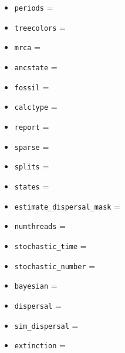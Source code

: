 \documentclass[12pt,a4]{article}
\begin{document}
\begin{itemize}
\item \texttt{periods} =\\

\item \texttt{treecolors} =\\

\item \texttt{mrca} =\\

\item \texttt{ancstate} =\\

\item \texttt{fossil} =\\

\item \texttt{calctype} =\\

\item \texttt{report} =\\

\item \texttt{sparse} =\\

\item \texttt{splits} =\\

\item \texttt{states} =\\

\item \texttt{estimate\_dispersal\_mask} =\\

\item \texttt{numthreads} =\\

\item \texttt{stochastic\_time} =\\

\item \texttt{stochastic\_number} =\\

\item \texttt{bayesian} =\\

\item \texttt{dispersal} =\\

\item \texttt{sim\_dispersal} =\\

\item \texttt{extinction} =\\


\end{itemize}
\end{document}
